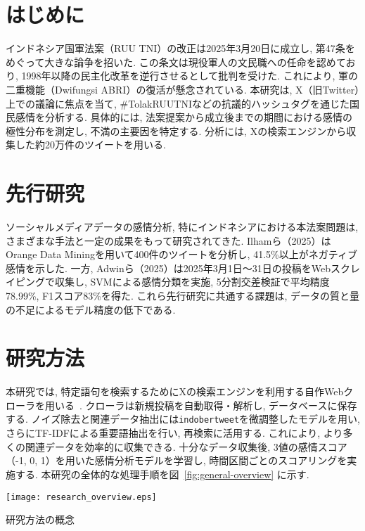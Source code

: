\documentclass{jabstract}
\begin{document}
\maketitle

\begin{multicols}{2}
\section{はじめに}
インドネシア国軍法案（RUU TNI）の改正は2025年3月20日に成立し, 第47条をめぐって大きな論争を招いた. この条文は現役軍人の文民職への任命を認めており, 1998年以降の民主化改革を逆行させるとして批判を受けた. これにより, 軍の二重機能（Dwifungsi ABRI）の復活が懸念されている\cite{HRW2024}. 
本研究は, X（旧Twitter）上での議論に焦点を当て, \#TolakRUUTNIなどの抗議的ハッシュタグを通じた国民感情を分析する. 具体的には, 法案提案から成立後までの期間における感情の極性分布を測定し, 不満の主要因を特定する. 分析には, Xの検索エンジンから収集した約20万件のツイートを用いる. 
\section{先行研究}
ソーシャルメディアデータの感情分析, 特にインドネシアにおける本法案問題は, さまざまな手法と一定の成果をもって研究されてきた. Ilhamら（2025）はOrange Data Miningを用いて400件のツイートを分析し, 41.5\%以上がネガティブ感情を示した. 一方, Adwinら（2025）は2025年3月1日～31日の投稿をWebスクレイピングで収集し, SVMによる感情分類を実施, 5分割交差検証で平均精度78.99\%, F1スコア83\%を得た. これら先行研究に共通する課題は, データの質と量の不足によるモデル精度の低下である. 
\section{研究方法}
本研究では, 特定語句を検索するためにXの検索エンジンを利用する自作Webクローラを用いる~\cite{twitter_search_operators}. クローラは新規投稿を自動取得・解析し, データベースに保存する. ノイズ除去と関連データ抽出には\texttt{indobertweet}を微調整したモデルを用い, さらにTF-IDFによる重要語抽出を行い, 再検索に活用する. これにより, より多くの関連データを効率的に収集できる. 
十分なデータ収集後, 3値の感情スコア（-1, 0, 1）を用いた感情分析モデルを学習し, 時間区間ごとのスコアリングを実施する. 本研究の全体的な処理手順を図~\ref{fig:general-overview} に示す. 

\begin{figurehere}
  \centering
    \texttt{[image: research\_overview.eps]}
    \caption{研究方法の概念}\label{fig:general-overview}
\end{figurehere}


\end{multicols}
\end{document}
